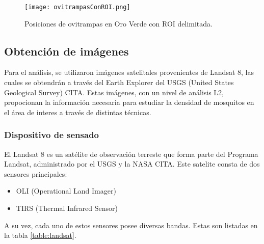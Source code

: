 \begin{figure}[H]
	\texttt{[image: ovitrampasConROI.png]}
	\centering
	\caption{Posiciones de ovitrampas en Oro Verde con ROI delimitada.}
	\label{fig:ovitrampas-ROI}
	
\end{figure}



\subsection{Obtención de imágenes}

Para el análisis, se utilizaron imágenes satelitales provenientes de Landsat 8, las cuales se obtendrán a través del Earth Explorer del USGS (United States Geological Survey) CITA. Estas imágenes, con un nivel de análisis L2, propocionan la información necesaria para estudiar la densidad de mosquitos en el área de interes a través de distintas técnicas.

\subsubsection{Dispositivo de sensado}

El Landsat 8 es un satélite de observación terreste que forma parte del Programa Landsat, administrado por el USGS y la NASA CITA. Este satelite consta de dos sensores principales:
\begin{itemize}
	\item OLI (Operational Land Imager)
	\item TIRS (Thermal Infrared Sensor)
\end{itemize}

A su vez, cada uno de estos sensores posee diversas bandas. Estas son listadas en la tabla \ref{table:landsat}.
\onehalfspacing

